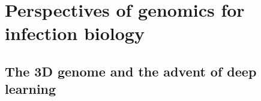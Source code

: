 
\chapter{Perspectives of genomics for infection biology} %

\label{ch:03-02} %


\section{The 3D genome and the advent of deep learning}


\blindtext